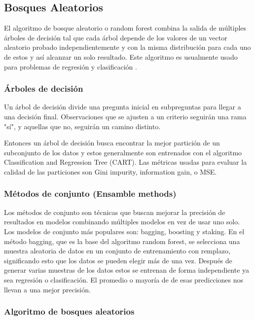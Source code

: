 \subsection{Bosques Aleatorios}
El algoritmo de bosque aleatorio o random forest combina la salida de múltiples árboles de decisión tal que cada árbol depende de los valores de un vector aleatorio probado independientemente y con la misma distribución para cada uno de estos y así alcanzar un solo resultado. Este algoritmo es usualmente usado para problemas de regresión y clasificación \parencite{WhatRandomForest2021}.

\subsubsection{Árboles de decisión}
Un árbol de decisión divide una pregunta inicial en subpreguntas para llegar a una decisión final. Observaciones que se ajusten a un criterio seguirán una rama "sí", y aquellas que no, seguirán un camino distinto.

Entonces un árbol de decisión busca encontrar la mejor partición de un subconjunto de los datos y estos generalmente son entrenados con el algoritmo Classification and Regression Tree (CART).
Las métricas usadas para evaluar la calidad de las particiones son Gini impurity, information gain, o MSE.   

\subsubsection{Métodos de conjunto (Ensamble methods)}

Los métodos de conjunto son técnicas que buscan mejorar la precisión de resultados en modelos combinando múltiples modelos en vez de usar uno solo. Los modelos de conjunto más populares son: bagging, boosting y staking.
En el método bagging, que es la base del algoritmo random forest, se selecciona una muestra aleatoria de datos en un conjunto de entrenamiento con remplazo, significando esto que los datos se pueden elegir más de una vez. Después de generar varias muestras de los datos estos se entrenan de forma independiente ya sea regresión o clasificación. El promedio o mayoría de de esas predicciones nos llevan a una mejor precisión.   

\subsubsection{Algoritmo de bosques aleatorios}

